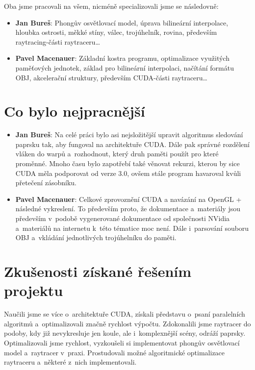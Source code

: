 \documentclass[12pt,a4paper,titlepage,final]{report}
\begin{document}
Oba jsme pracovali na všem, nicméně specializovali jsme se následovně:

\begin{itemize}
\item \textbf{Jan Bureš}: Phongův osvětlovací model, úprava bilineární interpolace, hloubka ostrosti, měkké stíny, válec, trojúhelník, rovina, především raytracing-části raytraceru\dots
\item \textbf{Pavel Macenauer}: Základní kostra programu, optimalizace využitých paměťových jednotek, základ pro bilineární interpolaci, načítání formátu OBJ, akcelerační struktury, především CUDA-části raytraceru\dots
\end{itemize}

\section{Co bylo nejpracnější}

\begin{itemize}
\item \textbf{Jan Bureš}: Na celé práci bylo asi nejsložitější upravit algoritmus sledování paprsku tak, aby fungoval na architektuře CUDA. Dále pak správné rozdělení vláken do warpů a~rozhodnout, který druh paměti použít pro které proměnné. Mnoho času bylo zapotřebí také věnovat rekurzi, kterou by sice CUDA měla podporovat od verze 3.0, ovšem stále program havaroval kvůli přetečení zásobníku.

\item \textbf{Pavel Macenauer}:  Celkové zprovoznění CUDA a navázání na OpenGL + následné vykreslení. To především proto, že dokumentace a~materiály jsou především v~podobě vygenerované dokumentace od společnosti NVidia a~materiálů na internetu k~této tématice moc není. Dále i~parsování souboru OBJ a~vkládání jednotlivých trojúhelníku do paměti.
\end{itemize}
\section{Zkušenosti získané řešením projektu}

Naučili jsme se více o~architektuře CUDA, získali představu o~psaní paralelních algoritmů a~optimalizovali značně rychlost výpočtu. Zdokonalili jsme raytracer do podoby, kdy již nevykresluje jen koule, ale i~komplexnější scény, odráží paprsky. Optimalizovali jsme rychlost, vyzkoušeli si implementovat phongův osvětlovací model a~raytracer v~praxi. Prostudovali možné algoritmické optimalizace raytraceru a~některé z~nich implementovali.
\end{document}

